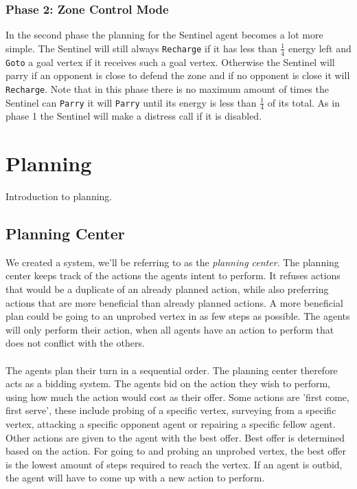 \documentclass[11pt]{article}
\begin{document}
\subsubsection*{Phase 2: Zone Control Mode}
In the second phase the planning for the Sentinel agent becomes a lot more simple. The Sentinel will still always {\tt Recharge} if it has less than $\frac{1}{4}$ energy left and {\tt Goto} a goal vertex if it receives such a goal vertex. Otherwise the Sentinel will parry if an opponent is close to defend the zone and if no opponent is close it will {\tt Recharge}. Note that in this phase there is no maximum amount of times the Sentinel can {\tt Parry} it will {\tt Parry} until its energy is less than $\frac{1}{4}$ of its total. As in phase 1 the Sentinel will make a distress call if it is disabled.

\section{Planning}
Introduction to planning.

\subsection{Planning Center}
We created a system, we'll be referring to as the \emph{planning center}. The planning center keeps track of the actions the agents intent to perform. It refuses actions that would be a duplicate of an already planned action, while also preferring actions that are more beneficial than already planned actions. A more beneficial plan could be going to an unprobed vertex in as few steps as possible. The agents will only perform their action, when all agents have an action to perform that does not conflict with the others.\\
\\
The agents plan their turn in a sequential order. The planning center therefore acts as a bidding system. The agents bid on the action they wish to perform, using how much the action would cost as their offer. Some actions are 'first come, first serve', these include probing of a specific vertex, surveying from a specific vertex, attacking a specific opponent agent or repairing a specific fellow agent. Other actions are given to the agent with the best offer. Best offer is determined based on the action. For going to and probing an unprobed vertex, the best offer is the lowest amount of steps required to reach the vertex. If an agent is outbid, the agent will have to come up with a new action to perform.
\end{document}
